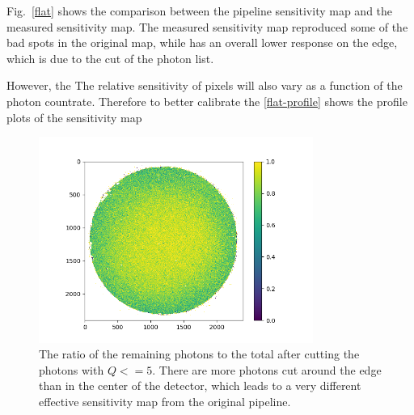 \documentclass[12pt, preprint]{aastex}
\begin{document}
Fig.~\ref{flat} shows the comparison between the pipeline sensitivity map and the measured sensitivity map.
The measured sensitivity map reproduced some of the bad spots in the original map, while has an overall lower response on the edge, which is due to the cut of the photon list.

However, the 
The relative sensitivity of pixels will also vary as a function of the photon countrate. 
Therefore to better calibrate the 
\ref{flat-profile} shows the profile plots of the sensitivity map


\begin{figure}[p]
\begin{center}
\includegraphics[width=0.8\textwidth]{figures/q50}
\end{center}
\caption{
  \label{qcut}
  The ratio of the remaining photons to the total after cutting the photons with $Q<=5$.
  There are more photons cut around the edge than in the center of the detector, which leads to a very different effective sensitivity map from the original pipeline.
}
\end{figure}
\end{document}
